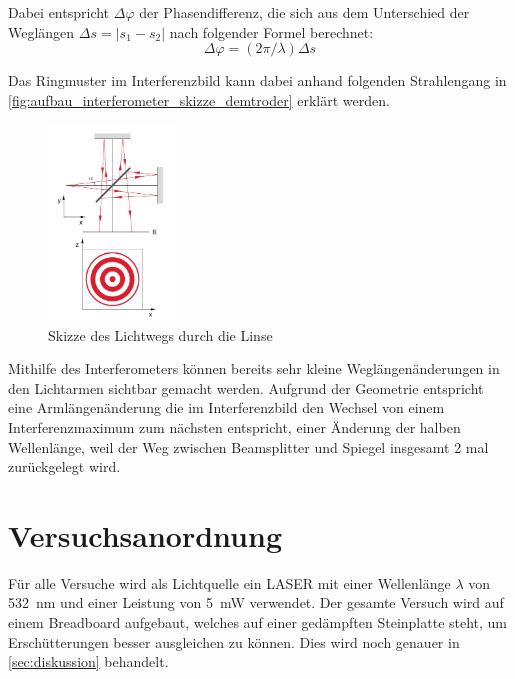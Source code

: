 \documentclass[12pt,english,ngerman]{scrartcl}
\begin{document}
Dabei entspricht $\Delta \varphi$ der Phasendifferenz, die sich aus dem
Unterschied der Weglängen $\Delta s=\left|s_1-s_2\right|$ nach folgender Formel
berechnet:
\begin{equation}
	\Delta \varphi=(2 \pi / \lambda) \Delta s
\end{equation}

Das Ringmuster im Interferenzbild kann dabei anhand folgenden Strahlengang in
\autoref{fig:aufbau_interferometer_skizze_demtroder} erklärt
werden.

\begin{figure}[H]
	\begin{center}
		\includegraphics[width =0.3\textwidth]{./figures/linse_demtroder.jpg}
	\end{center}
	\caption[Skizze des Lichtwegs durch die Linse] {Skizze des Lichtwegs durch die Linse
		\cite{demtroderExperimentalphysik2014}
	}\label{fig:aufbau_interferometer_skizze_demtroder}
\end{figure}

Mithilfe des Interferometers können bereits sehr kleine Weglängenänderungen in
den Lichtarmen sichtbar gemacht werden. Aufgrund der Geometrie entspricht eine
Armlängenänderung die im Interferenzbild den Wechsel von einem
Interferenzmaximum zum nächsten entspricht, einer Änderung der halben
Wellenlänge, weil der Weg zwischen Beamsplitter und Spiegel insgesamt 2 mal
zurückgelegt wird.\cite{krennInterferenzUndPolarisation2023}

\section{Versuchsanordnung}\label{sec:versuchsanordnung}

Für alle Versuche wird als Lichtquelle ein LASER mit einer Wellenlänge
$\lambda$ von \SI{532}{\nano\meter} und einer Leistung von \SI{5}{\milli\watt}
verwendet. Der gesamte Versuch wird auf einem Breadboard aufgebaut, welches auf
einer gedämpften Steinplatte steht, um Erschütterungen besser ausgleichen zu
können. Dies wird noch genauer in \autoref{sec:diskussion} behandelt.
\end{document}
